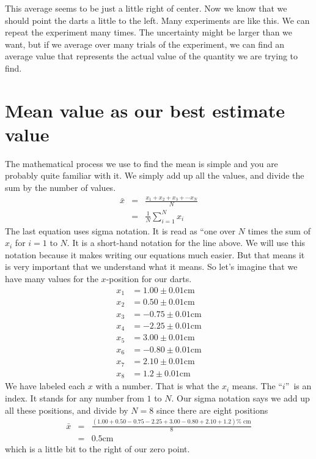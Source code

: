 \documentclass[twoside,11pt,ShortChapTitles]{BYUTextbook}
\begin{document}
This average seems to be just a little right of center. Now we know that we should point the darts a little
to the left. Many experiments are like this. We can repeat the experiment
many times. The uncertainty might be larger than we want, but if we average
over many trials of the experiment, we can find an average value that
represents the actual value of the quantity we are trying to find.

\section{Mean value as our best estimate value}

The mathematical process we use to find the mean is simple and you are
probably quite familiar with it. We simply add up all the values, and divide
the sum by the number of values.%
\begin{eqnarray*}
\bar{x} &=&\frac{x_{1}+x_{2}+x_{3}+\cdots x_{N}}{N} \\
&=&\frac{1}{N}\sum_{i=1}^{N}x_{i}
\end{eqnarray*}%
The last equation uses sigma notation. It is read as \textquotedblleft one
over $N$ times the sum of $x_{i}$ for $i=1$ to $N.$ It is a short-hand
notation for the line above. We will use this notation because it makes
writing our equations much easier. But that means it is very important that
we understand what it means. So let's imagine that we have many values for
the $x$-position for our darts.%
\[
\begin{aligned}
x_{1}&=1.00\pm 0.01\text{cm} \\
x_{2}&=0.50\pm 0.01\text{cm} \\
x_{3}&=-0.75\pm 0.01\text{cm} \\
x_{4}&=-2.25\pm 0.01\text{cm} \\
x_{5}&=3.00\pm 0.01\text{cm} \\
x_{6}&=-0.80\pm 0.01\text{cm} \\
x_{7}&=2.10\pm 0.01\text{cm} \\
x_{8}&=1.2\pm 0.01\text{cm}%
\end{aligned}%
\]%
We have labeled each $x$ with a number. That is what the $x_{i}$ means. The
\textquotedblleft $i$\textquotedblright\ is an index. It stands for any
number from $1$ to $N.$ Our sigma notation says we add up all these
positions, and divide by $N=8$ since there are eight positions%
\begin{eqnarray*}
\bar{x} &=&\frac{\left( 1.00+0.50-0.75-2.25+3.00-0.80+2.10+1.2\right) \text{%
cm}}{8} \\
&=&0.5\text{cm}
\end{eqnarray*}%
which is a little bit to the right of our zero point.
\end{document}
